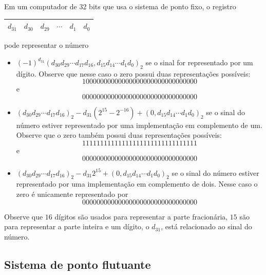 \begin{ex}
Em um computador de 32 bits que usa o sistema de ponto fixo, o registro
\begin{center}
  \begin{tabular}{|c|c|c|c|c|c|} \hline
    $d_{31}$ & $d_{30}$ & $d_{29}$ & $\cdots$ & $d_1$ & $d_0$\\\hline
  \end{tabular}  
\end{center}
pode representar o número
\begin{itemize}
\item $(-1)^{d_{31}}(d_{30}d_{29}\cdots d_{17}d_{16}, d_{15}d_{14}\cdots d_1d_0)_2$
se o sinal for representado por um dígito. Observe que nesse caso o zero possui duas representações possíveis: 
\begin{equation*}
  10000000000000000000000000000000  
\end{equation*}
e
\begin{equation*}
  00000000000000000000000000000000
\end{equation*}
\item $(d_{30}d_{29}\cdots d_{17}d_{16})_2-d_{31}(2^{15}-2^{-16})+(0,d_{15}d_{14}\cdots d_1d_0)_2$
se o sinal do número estiver representado por uma implementação em complemento de um. Observe que o zero também possui duas representações possíveis: 
\begin{equation*}
  11111111111111111111111111111111  
\end{equation*}
e
\begin{equation*}
  00000000000000000000000000000000
\end{equation*}
\item $(d_{30}d_{29}\cdots d_{17}d_{16})_2-d_{31}2^{15}+(0,d_{15}d_{14}\cdots d_1d_0)_2$
se o sinal do número estiver representado por uma implementação em complemento de dois. Nesse caso o zero é unicamente representado por
\begin{equation*}
  00000000000000000000000000000000  
\end{equation*}
\end{itemize}
Observe que $16$ dígitos são usados para representar a parte fracionária, $15$ são para representar a parte inteira e um dígito, o $d_{31}$, está relacionado ao sinal do número.
\end{ex}

\subsection{Sistema de ponto flutuante}

